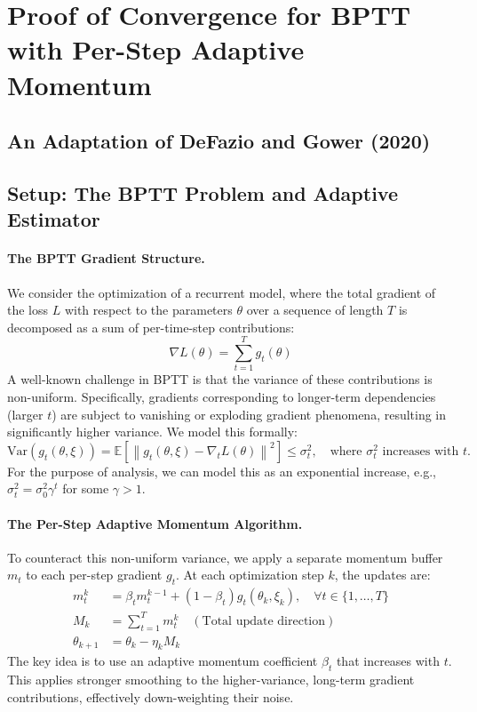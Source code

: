 \documentclass{article}
\newcommand{\E}{\mathbb{E}}
\newcommand{\norm}[1]{\left\lVert#1\right\rVert}
\newcommand{\grad}{\nabla}
\begin{document}
\section{Proof of Convergence for BPTT with Per-Step Adaptive Momentum}
\subsection{An Adaptation of DeFazio and Gower (2020)}

\subsection{Setup: The BPTT Problem and Adaptive Estimator}

\paragraph{The BPTT Gradient Structure.}
We consider the optimization of a recurrent model, where the total gradient of the loss \(L\) with respect to the parameters \(\theta\) over a sequence of length \(T\) is decomposed as a sum of per-time-step contributions:
\[ \grad L(\theta) = \sum_{t=1}^T g_t(\theta) \]
A well-known challenge in BPTT is that the variance of these contributions is non-uniform. Specifically, gradients corresponding to longer-term dependencies (larger \(t\)) are subject to vanishing or exploding gradient phenomena, resulting in significantly higher variance. We model this formally:
\[ \text{Var}(g_t(\theta, \xi)) = \E[\norm{g_t(\theta, \xi) - \grad_t L(\theta)}^2] \le \sigma_t^2, \quad \text{where } \sigma_t^2 \text{ increases with } t. \]
For the purpose of analysis, we can model this as an exponential increase, e.g., \(\sigma_t^2 = \sigma_0^2 \gamma^t\) for some \(\gamma > 1\).

\paragraph{The Per-Step Adaptive Momentum Algorithm.}
To counteract this non-uniform variance, we apply a separate momentum buffer \(m_t\) to each per-step gradient \(g_t\). At each optimization step \(k\), the updates are:
\begin{align*}
    m_t^k &= \beta_t m_t^{k-1} + (1 - \beta_t) g_t(\theta_k, \xi_k), \quad \forall t \in \{1, \dots, T\} \\
    M_k &= \sum_{t=1}^T m_t^k \quad (\text{Total update direction}) \\
    \theta_{k+1} &= \theta_k - \eta_k M_k
\end{align*}
The key idea is to use an adaptive momentum coefficient \(\beta_t\) that increases with \(t\). This applies stronger smoothing to the higher-variance, long-term gradient contributions, effectively down-weighting their noise.
\end{document}

